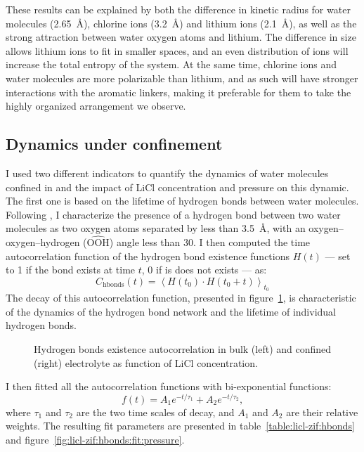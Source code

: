 \documentclass[thesis]{subfiles}
\begin{document}
These results can be explained by both the difference in kinetic
radius\cite{Marcus1988} for water molecules (\SI{2.65}{\AA}), chlorine
ions (\SI{3.2}{\AA}) and lithium ions (\SI{2.1}{\AA}), as well as
the strong attraction between water oxygen atoms and lithium. The difference in
size allows lithium ions to fit in smaller spaces, and an even distribution of
ions will increase the total entropy of the system. At the same time, chlorine
ions and water molecules are more polarizable than lithium, and as such will
have stronger interactions with the aromatic linkers, making it preferable for
them to take the highly organized arrangement we observe.

\FloatBarrier
\subsection{Dynamics under confinement}

I used two different indicators to quantify the dynamics of water molecules
confined in  and the impact of LiCl concentration and pressure on this
dynamic. The first one is based on the lifetime of hydrogen bonds between water
molecules. Following \citeauthor{Luzar1996}\cite{Luzar1996}, I characterize the
presence of a hydrogen bond between two water molecules as two oxygen atoms
separated by less than \SI{3.5}{\AA}, with an oxygen--oxygen--hydrogen
($\widehat{\text{OOH}}$) angle less than 30\textdegree. I then computed the
time autocorrelation function of the hydrogen bond existence functions $H(t)$
--- set to 1 if the bond exists at time $t$, 0 if is does not exists --- as:
\[C_{\text{hbonds}}(t) = \left\langle H(t_0) \cdot H(t_0 + t) \right\rangle_{t_0} \]
The decay of this autocorrelation function, presented in
figure~\ref{fig:licl-zif:hbonds}, is characteristic of the dynamics of the
hydrogen bond network and the lifetime of individual hydrogen bonds.

\begin{figure}[ht]
    \centering
    
    \caption{Hydrogen bonds existence autocorrelation in bulk (left) and
    confined (right) electrolyte as function of LiCl concentration.}
    \label{fig:licl-zif:hbonds}
\end{figure}

I then fitted all the autocorrelation functions with bi-exponential functions:
\[ f(t) = A_1 e^{-t / \tau_1} + A_2 e^{-t / \tau_2}, \]
where $\tau_1$ and $\tau_2$ are the two time scales of decay, and $A_1$ and
$A_2$ are their relative weights. The resulting fit parameters are presented in
table~\ref{table:licl-zif:hbonds} and figure~\ref{fig:licl-zif:hbonds:fit:pressure}.
\end{document}
